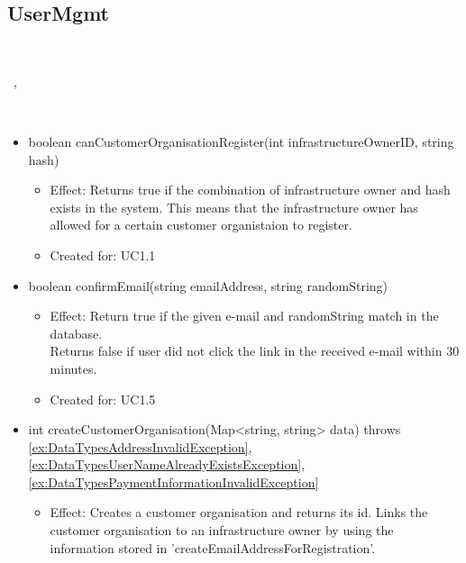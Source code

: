   \subsection{UserMgmt}\label{int:OnlineServiceOnlineServiceUserManagerUserMgmt}
    \begin{description}
      \item[Provided by:] \iconcomponent{}~
      \item[Required by:] \iconcomponent{}~, \iconcomponent{}~
      \item[Operations:] ~
    \begin{itemize}[noitemsep,nolistsep,leftmargin=-.25cm]
      \item \textsf{boolean canCustomerOrganisationRegister(int infrastructureOwnerID, string hash)}
        \begin{itemize}[noitemsep,nolistsep]
           \item Effect: Returns true if the combination of infrastructure owner and hash exists in the system. This means that the infrastructure owner has allowed for a certain customer organistaion to register.
\item Created for: UC1.1
        \end{itemize}
      \item \textsf{boolean confirmEmail(string emailAddress, string randomString)}
        \begin{itemize}[noitemsep,nolistsep]
           \item Effect: Return true if the given e-mail and randomString match in the database. \\
Returns false if user did not click the link in the received e-mail within 30 minutes.
\item Created for: UC1.5
        \end{itemize}
      \item \textsf{int createCustomerOrganisation(Map\textless{}string, string\textgreater{} data) throws \ref{ex:DataTypesAddressInvalidException}, \ref{ex:DataTypesUserNameAlreadyExistsException}, \ref{ex:DataTypesPaymentInformationInvalidException}}
        \begin{itemize}[noitemsep,nolistsep]
           \item Effect: Creates a customer organisation and returns its id. Links the customer organisation to an infrastructure owner by using the information stored in 'createEmailAddressForRegistration'.

\end{itemize}
\end{itemize}
\end{description}
